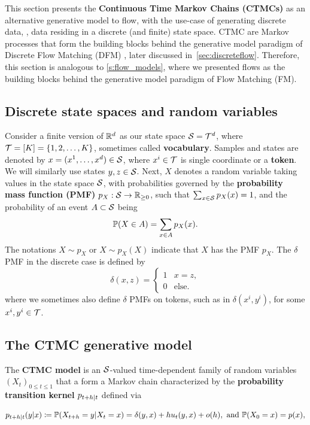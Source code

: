 \documentclass{fairmeta}
\newcommand{\highlight}[1]{{\color{metablue} \textbf{#1}}}
\numberwithin{equation}{section}
\begin{document}
This section presents the \highlight{Continuous Time Markov Chains (CTMCs)} as an alternative generative model to flow, with the use-case of generating discrete data, \ie, data residing in a discrete (and finite) state space. 
CTMC are Markov processes that form the building blocks behind the generative model paradigm of Discrete Flow Matching (DFM) \cite{campbell2024generative,gat2024discrete}, later discussed in~\cref{sec:discreteflow}.
Therefore, this section is analogous to \cref{s:flow_models}, where we presented flows as the building blocks behind the generative model paradigm of Flow Matching (FM).


\subsection{Discrete state spaces and random variables}

Consider a finite version of $\mathbb R^d$ as our state space ${\mathcal{S}} = {\mathcal{T}}^d$, where ${\mathcal{T}} = [K] = \left\{1,2,\ldots,K\right\}$, sometimes called \highlight{vocabulary}.
Samples and states are denoted by $x=(x^1,\ldots,x^d)\in {\mathcal{S}}$, where $x^i\in {\mathcal{T}}$ is single coordinate or a \highlight{token}. We will similarly use states $y,z\in{\mathcal{S}}$.
Next, $X$ denotes a random variable taking values in the state space ${\mathcal{S}}$, with probabilities governed by the \highlight{probability mass function (PMF)} $p_X:{\mathcal{S}}\rightarrow\mathbb R_{\geq 0}$, such that $\sum_{x\in {\mathcal{S}}}p_X(x) = 1$, and the probability of an event $A\subset {\mathcal{S}}$ being
\begin{equation}
    {\mathbb{P}}(X\in A) = \sum_{x\in A} p_X(x).
\end{equation}
The notations $X\sim p_X$ or $X\sim p_X(X)$ indicate that $X$ has the PMF $p_X$.
The $\delta$ PMF in the discrete case is defined by 
\begin{equation}
    \delta(x,z) = \begin{cases}
        1 & x=z, \\ 0 & \text{else}.
    \end{cases}
\end{equation}
where we sometimes also define $\delta$ PMFs on tokens, such as in $\delta(x^i,y^i)$, for some $x^i,y^i\in {\mathcal{T}}$.



\subsection{The CTMC generative model}

The \highlight{CTMC model} is an ${\mathcal{S}}$-valued time-dependent family of random variables $(X_t)_{0\leq t \leq 1}$ that a form a Markov chain characterized by the \highlight{probability transition kernel} $p_{t+h|t}$ defined via
\begin{myframe}
\begin{equation}
    \tkernel_{t+h|t}(y|x) \defe \sP(X_{t+h}=y \vert X_t = x) = \delta(y,x) + h u_t(y,x) + o(h), \text{ and } 
    \sP(X_0 = x)= p(x),\label{e:ctmc_model} %
    \end{equation}
\end{myframe}
\end{document}
